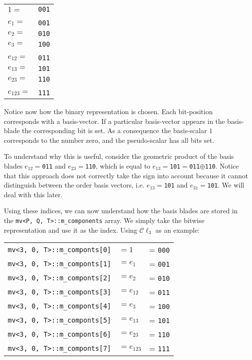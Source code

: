 \documentclass[10pt]{article}
\begin{document}
\begin{center}
\begin{tabular}{ll}
$1 =$ & \verb"001" \\
&\\
$e_1 =$ & \verb"001" \\
$e_2 =$ & \verb"010" \\
$e_3 =$ & \verb"100" \\
&\\
$e_{12} =$ & \verb"011" \\
$e_{13} =$ & \verb"101" \\
$e_{23} =$ & \verb"110" \\
&\\
$e_{123} =$ & \verb"111" \\
\end{tabular}
\end{center}

Notice now how the binary representation is chosen. Each bit-position corresponds with a basis-vector. If a particular basis-vector appears in the basis-blade the corresponding bit is set. As a consequence the basis-scalar $1$ corresponds to the number zero, and the pseudo-scalar has all bits set.

To understand why this is useful, consider the geometric product of the basis blades $e_{12} =$\verb"011" and $e_{23} =$\verb"110", which is equal to $e_{13} =
$\verb"101"$=$\verb"011"$\oplus$\verb"110". Notice that this approach does not correctly take the sign into account because it cannot distinguish between the order basis vectors, i.e. $e_{13} =$\verb"101" and $e_{31} =$\verb"101". We will deal with this later.

Using these indices, we can now understand how the basis blades are stored in the \verb"mv<P, Q, T>::m_components" array. We simply take the bitwise representation and use it as the index. Using $\mathcal{C}\ell_3$ as an example:

\begin{center}
\begin{tabular}{lll}
\verb"mv<3, 0, T>::m_componts[0]" & $= 1 $      &= \verb"000"\\
\verb"mv<3, 0, T>::m_componts[1]" & $= e_1$     &= \verb"001" \\
\verb"mv<3, 0, T>::m_componts[2]" & $= e_2$     &= \verb"010"\\
\verb"mv<3, 0, T>::m_componts[3]" & $= e_{12}$  &= \verb"011"\\
\verb"mv<3, 0, T>::m_componts[4]" & $= e_3$     &= \verb"100"\\
\verb"mv<3, 0, T>::m_componts[5]" & $= e_{13}$  &= \verb"101"\\
\verb"mv<3, 0, T>::m_componts[6]" & $= e_{23}$  &= \verb"110"\\
\verb"mv<3, 0, T>::m_componts[7]" & $= e_{123}$ &= \verb"111"
\end{tabular}
\end{center}
\end{document}
